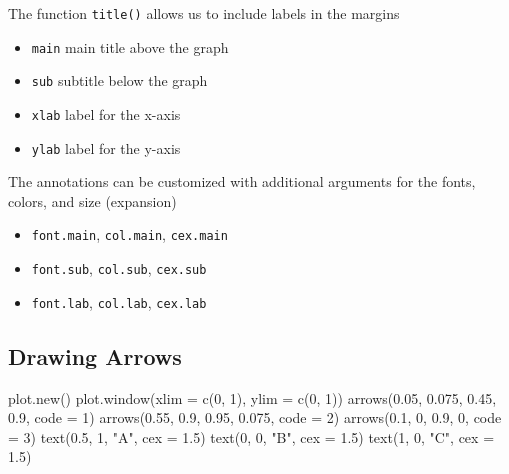 \documentclass[
]{book}
\newenvironment{Shaded}{\begin{snugshade}}{\end{snugshade}}
\newcommand{\AttributeTok}[1]{\textcolor[rgb]{0.77,0.63,0.00}{#1}}
\newcommand{\DecValTok}[1]{\textcolor[rgb]{0.00,0.00,0.81}{#1}}
\newcommand{\FloatTok}[1]{\textcolor[rgb]{0.00,0.00,0.81}{#1}}
\newcommand{\FunctionTok}[1]{\textcolor[rgb]{0.00,0.00,0.00}{#1}}
\newcommand{\NormalTok}[1]{#1}
\newcommand{\StringTok}[1]{\textcolor[rgb]{0.31,0.60,0.02}{#1}}
\begin{document}
The function \texttt{title()} allows us to include labels in the margins

\begin{itemize}
\item
  \texttt{main} main title above the graph
\item
  \texttt{sub} subtitle below the graph
\item
  \texttt{xlab} label for the x-axis
\item
  \texttt{ylab} label for the y-axis
\end{itemize}

The annotations can be customized with additional arguments for the fonts,
colors, and size (expansion)

\begin{itemize}
\item
  \texttt{font.main}, \texttt{col.main}, \texttt{cex.main}
\item
  \texttt{font.sub}, \texttt{col.sub}, \texttt{cex.sub}
\item
  \texttt{font.lab}, \texttt{col.lab}, \texttt{cex.lab}
\end{itemize}

\hypertarget{drawing-arrows}{%
\subsection{Drawing Arrows}\label{drawing-arrows}}

\begin{Shaded}
\begin{Highlighting}[]
\FunctionTok{plot.new}\NormalTok{()}
\FunctionTok{plot.window}\NormalTok{(}\AttributeTok{xlim =} \FunctionTok{c}\NormalTok{(}\DecValTok{0}\NormalTok{, }\DecValTok{1}\NormalTok{), }\AttributeTok{ylim =} \FunctionTok{c}\NormalTok{(}\DecValTok{0}\NormalTok{, }\DecValTok{1}\NormalTok{))}
\FunctionTok{arrows}\NormalTok{(}\FloatTok{0.05}\NormalTok{, }\FloatTok{0.075}\NormalTok{, }\FloatTok{0.45}\NormalTok{, }\FloatTok{0.9}\NormalTok{, }\AttributeTok{code =} \DecValTok{1}\NormalTok{)}
\FunctionTok{arrows}\NormalTok{(}\FloatTok{0.55}\NormalTok{, }\FloatTok{0.9}\NormalTok{, }\FloatTok{0.95}\NormalTok{, }\FloatTok{0.075}\NormalTok{, }\AttributeTok{code =} \DecValTok{2}\NormalTok{)}
\FunctionTok{arrows}\NormalTok{(}\FloatTok{0.1}\NormalTok{, }\DecValTok{0}\NormalTok{, }\FloatTok{0.9}\NormalTok{, }\DecValTok{0}\NormalTok{, }\AttributeTok{code =} \DecValTok{3}\NormalTok{)}
\FunctionTok{text}\NormalTok{(}\FloatTok{0.5}\NormalTok{, }\DecValTok{1}\NormalTok{, }\StringTok{"A"}\NormalTok{, }\AttributeTok{cex =} \FloatTok{1.5}\NormalTok{)}
\FunctionTok{text}\NormalTok{(}\DecValTok{0}\NormalTok{, }\DecValTok{0}\NormalTok{, }\StringTok{"B"}\NormalTok{, }\AttributeTok{cex =} \FloatTok{1.5}\NormalTok{)}
\FunctionTok{text}\NormalTok{(}\DecValTok{1}\NormalTok{, }\DecValTok{0}\NormalTok{, }\StringTok{"C"}\NormalTok{, }\AttributeTok{cex =} \FloatTok{1.5}\NormalTok{)}
\end{Highlighting}
\end{Shaded}
\end{document}
